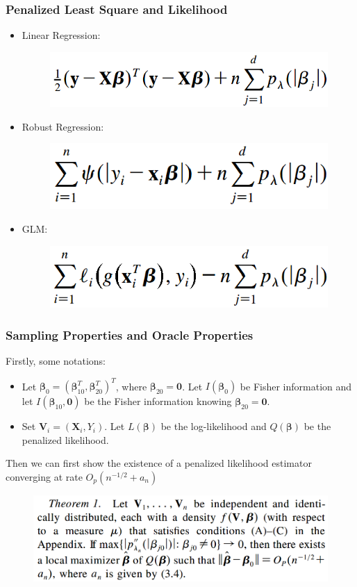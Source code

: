 \documentclass{beamer}
\begin{document}
	\begin{frame}
		\frametitle{Penalized Least Square and Likelihood}
		\begin{itemize}
			\item
			Linear Regression:
			\begin{figure}
				\includegraphics[width=0.5\linewidth]{image009.png}
			\end{figure}
			\item
			Robust Regression:
			\begin{figure}
				\includegraphics[width=0.5\linewidth]{image010.png}
			\end{figure} 
			\item
			GLM:
			\begin{figure}
				\includegraphics[width=0.5\linewidth]{image011.png}
			\end{figure}  
		\end{itemize}
	\end{frame}
	
	
	\begin{frame}
		\frametitle{Sampling Properties and Oracle Properties}
		Firstly, some notations:
		\begin{itemize}
			\item
			Let $\bm{\beta}_0 = (\bm{\beta}_{10}^T, \bm{\beta}_{20}^T)^T$, where $\bm{\beta}_{20} = \bm{0}$. Let $I(\bm{\beta}_0)$ be Fisher information and let $I(\bm{\beta}_{10}, \bm{0})$ be the Fisher information knowing $\bm{\beta}_{20} = \bm{0}$.
			\item
			Set $\bm{V}_i = (\bm{X}_i, Y_i)$. Let $L(\bm{\beta})$ be the log-likelihood and $Q(\bm{\beta})$ be the penalized likelihood.
		\end{itemize}
		Then we can first show the existence of a penalized likelihood estimator converging at rate $O_p(n^{-1/2} + a_n)$
		\begin{figure}
			\includegraphics[width=0.8\linewidth]{image012.png}
		\end{figure}
	\end{frame}
	
\end{document}
